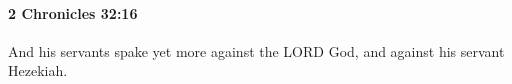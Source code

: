 
		\paragraph{2 Chronicles 32:16} %
			\label{2CHRONICLES-32-16}

			And his servants spake yet more against the LORD God, and against his servant Hezekiah.



